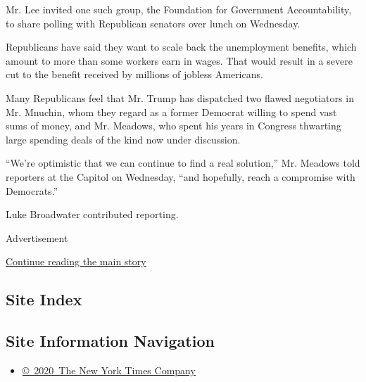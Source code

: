 Mr. Lee invited one such group, the Foundation for Government
Accountability, to share polling with Republican senators over lunch on
Wednesday.

Republicans have said they want to scale back the unemployment benefits,
which amount to more than some workers earn in wages. That would result
in a severe cut to the benefit received by millions of jobless
Americans.

Many Republicans feel that Mr. Trump has dispatched two flawed
negotiators in Mr. Mnuchin, whom they regard as a former Democrat
willing to spend vast sums of money, and Mr. Meadows, who spent his
years in Congress thwarting large spending deals of the kind now under
discussion.

``We're optimistic that we can continue to find a real solution,'' Mr.
Meadows told reporters at the Capitol on Wednesday, ``and hopefully,
reach a compromise with Democrats.''

Luke Broadwater contributed reporting.

Advertisement

\protect\hyperlink{after-bottom}{Continue reading the main story}

\hypertarget{site-index}{%
\subsection{Site Index}\label{site-index}}

\hypertarget{site-information-navigation}{%
\subsection{Site Information
Navigation}\label{site-information-navigation}}

\begin{itemize}
\tightlist
\item
  \href{https://help.nytimes.com/hc/en-us/articles/115014792127-Copyright-notice}{©~2020~The
  New York Times Company}
\end{itemize}

